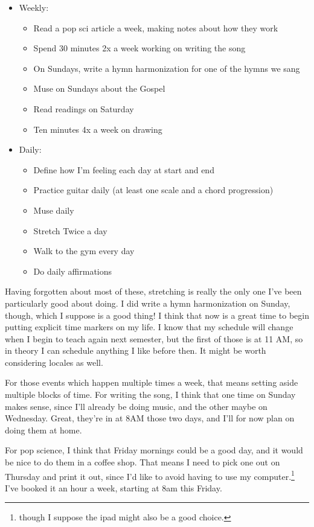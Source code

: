 \documentclass[12pt]{article}[titlepage]
\renewcommand{\,}{\textsuperscript{,}}
\begin{document}
\begin{itemize}
\item Weekly:  
\begin{itemize}  
\item Read a pop sci article a week, making notes about how they work  
\item Spend 30 minutes 2x a week working on writing the song  
\item On Sundays, write a hymn harmonization for one of the hymns we sang  
\item Muse on Sundays about the Gospel  
\item Read readings on Saturday  
\item Ten minutes 4x a week on drawing  
\end{itemize}  
\item Daily:  
\begin{itemize}  
\item Define how I'm feeling each day at start and end   
\item Practice guitar daily (at least one scale and a chord progression)  
\item Muse daily  
\item Stretch Twice a day  
\item Walk to the gym every day  
\item Do daily affirmations  
\end{itemize}  
\end{itemize}

Having forgotten about most of these, stretching is really the only one I've been particularly good about doing. I did write a hymn harmonization on Sunday, though, which I suppose is a good thing!  
I think that now is a great time to begin putting explicit time markers on my life.  
I know that my schedule will change when I begin to teach again next semester, but the first of those is at 11 AM, so in theory I can schedule anything I like before then.  
It might be worth considering locales as well.

For those events which happen multiple times a week, that means setting aside multiple blocks of time.  
For writing the song, I think that one time on Sunday makes sense, since I'll already be doing music, and the other maybe on Wednesday.  
Great, they're in at 8AM those two days, and I'll for now plan on doing them at home.

For pop science, I think that Friday mornings could be a good day, and it would be nice to do them in a coffee shop.  
That means I need to pick one out on Thursday and print it out, since I'd like to avoid having to use my computer.\footnote{though I suppose the ipad might also be a good choice.}  
I've booked it an hour a week, starting at 8am this Friday.
\end{document}
